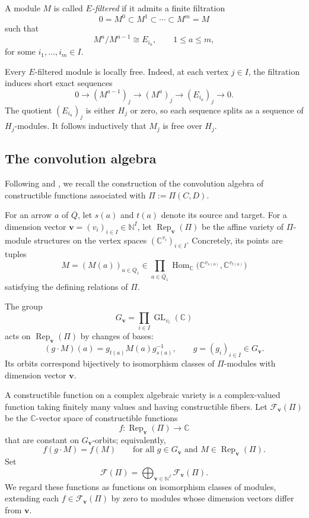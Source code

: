 \documentclass[12pt,reqno]{amsart}
\numberwithin{equation}{section}
\theoremstyle{definition}
\theoremstyle{remark}
\newcommand{\Hom}{\operatorname{Hom}}
\newcommand{\Rep}{\operatorname{Rep}}
\newcommand{\GL}{\operatorname{GL}}
\theoremstyle{plain}
\theoremstyle{plain}
\begin{document}
   A module $M$ is called \emph{$E$-filtered} if it admits
   a finite filtration
   \[
   0=M^0\subset M^1\subset\cdots\subset M^m=M
   \]
   such that
   \[
   M^a/M^{a-1}\cong E_{i_a}, \qquad 1\leq a\leq m,
   \]
   for some $i_1,\ldots,i_m\in I$.

   Every $E$-filtered module is locally free. Indeed, at each vertex $j\in I$, the filtration induces short exact sequences
   \[
   0\longrightarrow (M^{a-1})_j \longrightarrow (M^a)_j \longrightarrow (E_{i_a})_j \longrightarrow 0.
   \]
   The quotient $(E_{i_a})_j$ is either $H_j$ or zero, so each sequence splits as a sequence of $H_j$-modules. It follows inductively that $M_j$ is free over $H_j$.

\subsection{The convolution algebra}
   Following  \cite[Section~4.1] {GLS16} and \cite[Section~2.5] {GLS18}, we recall the construction of the convolution algebra of constructible functions associated with $\Pi:=\Pi(C,D)$. 

   For an arrow $a$ of $\overline Q$, let $s(a)$ and $t(a)$ denote its source and target. For a dimension vector $\mathbf v=(v_i)_{i\in I}\in\mathbb N^I$, let $\Rep_{\mathbf v}(\Pi)$ be the affine variety of $\Pi$-module structures on the vertex spaces $(\mathbb C^{v_i})_{i\in I}$. Concretely, its points are tuples
   \[
   M=(M(a))_{a\in\overline Q_1} \in \prod_{a\in\overline Q_1} \Hom_{\mathbb C} \bigl(\mathbb C^{v_{s(a)}}, \mathbb C^{v_{t(a)}}\bigr)
   \]
   satisfying the defining relations of $\Pi$.

   The group
   \[
   G_{\mathbf v}
   =
   \prod_{i\in I}\GL_{v_i}(\mathbb C)
   \]
   acts on $\Rep_{\mathbf v}(\Pi)$ by changes of bases:
   \[
   (g\cdot M)(a)
   =
   g_{t(a)}M(a)g_{s(a)}^{-1}, \qquad g=(g_i)_{i\in I}\in G_{\mathbf v}.
   \]
   Its orbits correspond bijectively to isomorphism classes of $\Pi$-modules with dimension vector $\mathbf v$.

   A constructible function on a complex algebraic variety is a complex-valued function taking finitely many values and having constructible fibers. Let $\mathcal F_{\mathbf v}(\Pi)$ be the $\mathbb C$-vector space of constructible functions
   \[
   f:\Rep_{\mathbf v}(\Pi)\longrightarrow \mathbb C
   \]
   that are constant on $G_{\mathbf v}$-orbits; equivalently,
   \[
   f(g\cdot M)=f(M) \qquad \text{for all }g\in G_{\mathbf v} \text{ and }M\in\Rep_{\mathbf v}(\Pi).
   \]
   Set
   \[ \mathcal F(\Pi)
   =
   \bigoplus_{\mathbf v\in\mathbb N^I} \mathcal F_{\mathbf v}(\Pi).
   \]
   We regard these functions as functions on isomorphism classes of modules, extending each $f\in\mathcal F_{\mathbf v}(\Pi)$ by zero to modules whose dimension vectors differ from $\mathbf v$.
\end{document}
